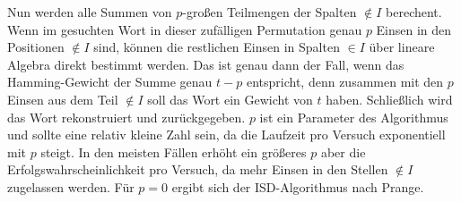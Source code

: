 \documentclass[a4paper,10pt,ngerman]{scrartcl}
\begin{document}
Nun werden alle Summen von $p$-großen Teilmengen der Spalten $\notin I$ berechent. 
Wenn im gesuchten Wort in dieser zufälligen Permutation genau $p$ Einsen in den Positionen $\notin I$ sind, können die restlichen Einsen in Spalten $\in I$ über lineare Algebra direkt bestimmt werden. 
Das ist genau dann der Fall, wenn das Hamming-Gewicht der Summe genau $t-p$ entspricht, denn zusammen mit den $p$ Einsen aus dem Teil $\notin I$ soll das Wort ein Gewicht von $t$ haben. 
Schließlich wird das Wort rekonstruiert und zurückgegeben. 
$p$ ist ein Parameter des Algorithmus und sollte eine relativ kleine Zahl sein, da die Laufzeit pro Versuch exponentiell mit $p$ steigt. In den meisten Fällen erhöht ein größeres $p$ aber die Erfolgswahrscheinlichkeit pro Versuch, da mehr Einsen in den Stellen $\notin I$ zugelassen werden. Für $p=0$ ergibt sich der ISD-Algorithmus nach Prange.
\end{document}
